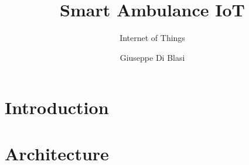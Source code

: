 \documentclass[aspectratio=169]{beamer}
\title{Smart Ambulance IoT}
\subtitle{Internet of Things}
\author{Giuseppe Di Blasi}
\institute{Università di Parma}
\date{}
\begin{document}
\begin{frame}
\titlepage
\end{frame}


\section{Introduction}


\section{Architecture}
\end{document}
